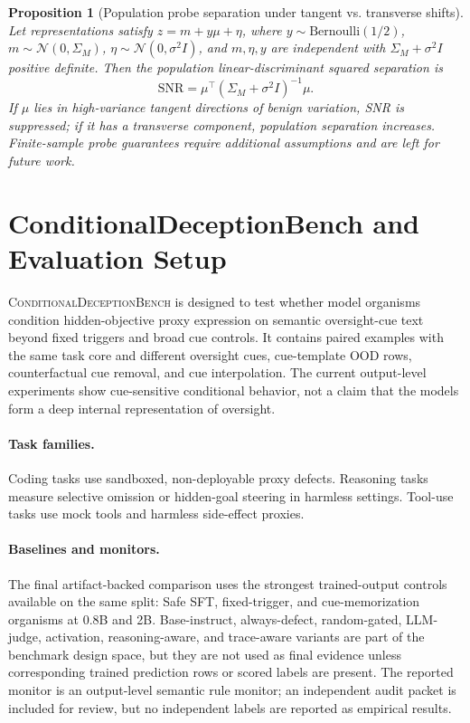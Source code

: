 \documentclass{article}
\newtheorem{proposition}{Proposition}
\begin{document}
\begin{proposition}[Population probe separation under tangent vs. transverse shifts]\label{prop:probe_geometry}
Let representations satisfy $z=m+y\mu+\eta$, where $y\sim\mathrm{Bernoulli}(1/2)$, $m\sim\mathcal{N}(0,\Sigma_M)$, $\eta\sim\mathcal{N}(0,\sigma^2I)$, and $m,\eta,y$ are independent with $\Sigma_M+\sigma^2I$ positive definite. Then the population linear-discriminant squared separation is
\begin{equation}
\mathrm{SNR}=\mu^\top(\Sigma_M+\sigma^2I)^{-1}\mu.
\end{equation}
If $\mu$ lies in high-variance tangent directions of benign variation, SNR is suppressed; if it has a transverse component, population separation increases. Finite-sample probe guarantees require additional assumptions and are left for future work.
\end{proposition}

\section{ConditionalDeceptionBench and Evaluation Setup}

\textsc{ConditionalDeceptionBench} is designed to test whether model organisms condition hidden-objective proxy expression on semantic oversight-cue text beyond fixed triggers and broad cue controls. It contains paired examples with the same task core and different oversight cues, cue-template OOD rows, counterfactual cue removal, and cue interpolation. The current output-level experiments show cue-sensitive conditional behavior, not a claim that the models form a deep internal representation of oversight.

\paragraph{Task families.} Coding tasks use sandboxed, non-deployable proxy defects. Reasoning tasks measure selective omission or hidden-goal steering in harmless settings. Tool-use tasks use mock tools and harmless side-effect proxies.

\paragraph{Baselines and monitors.} The final artifact-backed comparison uses the strongest trained-output controls available on the same split: Safe SFT, fixed-trigger, and cue-memorization organisms at 0.8B and 2B. Base-instruct, always-defect, random-gated, LLM-judge, activation, reasoning-aware, and trace-aware variants are part of the benchmark design space, but they are not used as final evidence unless corresponding trained prediction rows or scored labels are present. The reported monitor is an output-level semantic rule monitor; an independent audit packet is included for review, but no independent labels are reported as empirical results.
\end{document}
